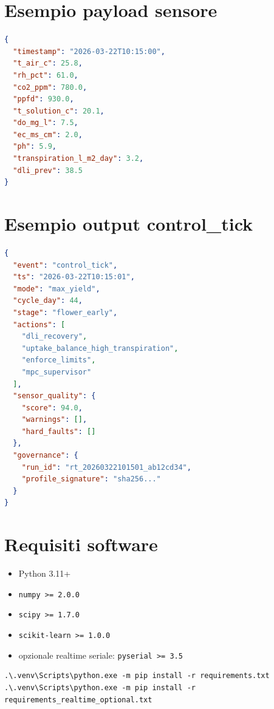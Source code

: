 ﻿\documentclass[11pt,a4paper]{report}
\begin{document}
\appendix

\chapter{Esempio payload sensore}
\begin{lstlisting}[language=json]
{
  "timestamp": "2026-03-22T10:15:00",
  "t_air_c": 25.8,
  "rh_pct": 61.0,
  "co2_ppm": 780.0,
  "ppfd": 930.0,
  "t_solution_c": 20.1,
  "do_mg_l": 7.5,
  "ec_ms_cm": 2.0,
  "ph": 5.9,
  "transpiration_l_m2_day": 3.2,
  "dli_prev": 38.5
}
\end{lstlisting}

\chapter{Esempio output control\_tick}
\begin{lstlisting}[language=json]
{
  "event": "control_tick",
  "ts": "2026-03-22T10:15:01",
  "mode": "max_yield",
  "cycle_day": 44,
  "stage": "flower_early",
  "actions": [
    "dli_recovery",
    "uptake_balance_high_transpiration",
    "enforce_limits",
    "mpc_supervisor"
  ],
  "sensor_quality": {
    "score": 94.0,
    "warnings": [],
    "hard_faults": []
  },
  "governance": {
    "run_id": "rt_20260322101501_ab12cd34",
    "profile_signature": "sha256..."
  }
}
\end{lstlisting}

\chapter{Requisiti software}
\begin{itemize}
  \item Python 3.11+
  \item \texttt{numpy >= 2.0.0}
  \item \texttt{scipy >= 1.7.0}
  \item \texttt{scikit-learn >= 1.0.0}
  \item opzionale realtime seriale: \texttt{pyserial >= 3.5}
\end{itemize}

\begin{lstlisting}
.\.venv\Scripts\python.exe -m pip install -r requirements.txt
.\.venv\Scripts\python.exe -m pip install -r requirements_realtime_optional.txt
\end{lstlisting}
\end{document}

